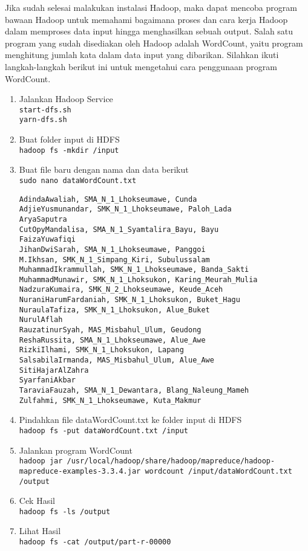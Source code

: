 \documentclass[a4paper]{tufte-handout}
\begin{document}

Jika sudah selesai malakukan instalasi Hadoop, maka dapat mencoba program bawaan Hadoop untuk memahami bagaimana proses dan cara kerja Hadoop dalam memproses data input hingga menghasilkan sebuah output. Salah satu program yang sudah disediakan oleh Hadoop adalah WordCount, yaitu program menghitung jumlah kata dalam data input yang dibarikan. Silahkan ikuti langkah-langkah berikut ini untuk mengetahui cara penggunaan program WordCount.

\begin{enumerate}
\item Jalankan Hadoop Service \\
{\tt start-dfs.sh} \\
{\tt yarn-dfs.sh}

\item Buat folder input di HDFS\\
{\tt hadoop fs -mkdir /input}

\item Buat file baru dengan nama dan data berikut \\
{\tt sudo nano dataWordCount.txt}
\begin{lstlisting}
AdindaAwaliah, SMA_N_1_Lhokseumawe, Cunda
AdjieYusmunandar, SMK_N_1_Lhokseumawe, Paloh_Lada
AryaSaputra
CutOpyMandalisa, SMA_N_1_Syamtalira_Bayu, Bayu
FaizaYuwafiqi
JihanDwiSarah, SMA_N_1_Lhokseumawe, Panggoi
M.Ikhsan, SMK_N_1_Simpang_Kiri, Subulussalam
MuhammadIkrammullah, SMK_N_1_Lhokseumawe, Banda_Sakti
MuhammadMunawir, SMK_N_1_Lhoksukon, Karing_Meurah_Mulia
NadzuraKumaira, SMK_N_2_Lhokseumawe, Keude_Aceh
NuraniHarumFardaniah, SMK_N_1_Lhoksukon, Buket_Hagu
NuraulaTafiza, SMK_N_1_Lhoksukon, Alue_Buket
NurulAflah
RauzatinurSyah, MAS_Misbahul_Ulum, Geudong
ReshaRussita, SMA_N_1_Lhokseumawe, Alue_Awe
RizkiIlhami, SMK_N_1_Lhoksukon, Lapang
SalsabilaIrmanda, MAS_Misbahul_Ulum, Alue_Awe
SitiHajarAlZahra
SyarfaniAkbar
TaraviaFauzah, SMA_N_1_Dewantara, Blang_Naleung_Mameh
Zulfahmi, SMK_N_1_Lhokseumawe, Kuta_Makmur
\end{lstlisting}

\item Pindahkan file dataWordCount.txt ke folder input di HDFS \\
{\tt hadoop fs -put dataWordCount.txt /input}

\item Jalankan program WordCount \\
{\tt hadoop jar /usr/local/hadoop/share/hadoop/mapreduce/hadoop-mapreduce-examples-3.3.4.jar wordcount /input/dataWordCount.txt /output}

\item Cek Hasil \\
{\tt hadoop fs -ls /output}

\item Lihat Hasil \\
{\tt hadoop fs -cat /output/part-r-00000}
\end{enumerate}
\end{document}
